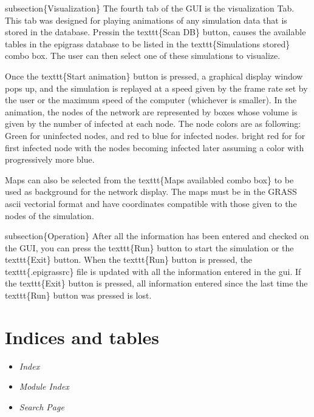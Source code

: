 \documentclass[a4paper,10pt]{manual}
\begin{document}
subsection\{Visualization\}
The fourth tab of the GUI is the visualization Tab. This tab was designed for playing animations of any simulation data that is stored in the database. Pressin the texttt\{Scan DB\} button, causes the available tables in the  epigrass database to be listed in the texttt\{Simulations stored\} combo box. The user can then select one of these simulations to visualize.

Once the texttt\{Start animation\} button is pressed, a graphical display window pops up, and the simulation is replayed at a speed given by the frame rate set by the user  or the maximum speed of the computer (whichever is smaller). In the animation, the nodes of the network are represented by boxes whose volume is given by the number of infected at each node. The node colors are as following: Green for uninfected nodes, and red to blue for infected nodes. bright red for for first infected node with the nodes becoming infected later assuming a color with progressively more blue.

Maps can also be selected from the texttt\{Maps availabled combo box\} to be used as background for the network display. The maps must be in the GRASS ascii vectorial format and have coordinates compatible with those given to the nodes of the simulation.

subsection\{Operation\}
After all the information has been entered and checked on the GUI, you can press the texttt\{Run\} button to start the simulation or the texttt\{Exit\} button. When the texttt\{Run\} button is pressed, the texttt\{.epigrassrc\} file is updated with all the information entered in the gui. If the texttt\{Exit\} button is pressed, all information entered since the last time the texttt\{Run\} button was pressed is lost.

\resetcurrentobjects

\resetcurrentobjects


\chapter{Indices and tables}
\begin{itemize}
\item {} 
\emph{Index}

\item {} 
\emph{Module Index}

\item {} 
\emph{Search Page}

\end{itemize}
\renewcommand{\indexname}{Module Index}\printmodindex\renewcommand{\indexname}{Index}

\printindex
\end{document}
